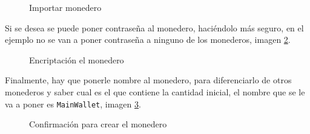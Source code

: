 \begin{figure}[H]
	\centering
	\caption{Importar monedero}
	\label{fig:wallet-8}
\end{figure}

Si se desea se puede poner contraseña al monedero, haciéndolo más seguro, en el ejemplo no se van a poner contraseña a ninguno de los monederos, imagen \ref{fig:wallet-9}.

\begin{figure}[H]
	\centering
	\caption{Encriptación el monedero}
	\label{fig:wallet-9}
\end{figure}

\newpage
Finalmente, hay que ponerle nombre al monedero, para diferenciarlo de otros monederos y saber cual es el que contiene la cantidad inicial, el nombre que se le va a poner es \texttt{MainWallet}, imagen \ref{fig:wallet-10}.

\begin{figure}[H]
	\centering
	\caption{Confirmación para crear el monedero}
	\label{fig:wallet-10}
\end{figure}

